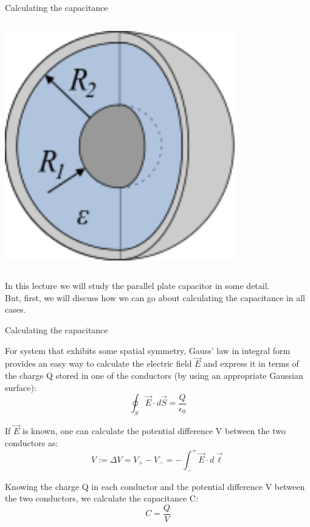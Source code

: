 \begin{frame}{Calculating the capacitance}
\begin{columns}
\begin{column}{0.33\textwidth}
\begin{center}
     \includegraphics[width=0.75\textwidth]{./images/schematics/capacitors_spherical_1.png}\\
   \end{center}
  \end{column}
\end{columns}

\vspace{0.2cm}
In this lecture we will study the parallel plate capacitor in some detail.\\

\vspace{0.2cm}
But, first, we will discuss how we can go about calculating the capacitance in all cases.\\

\end{frame}

%
%
%

\begin{frame}{Calculating the capacitance}

For system that exhibits some spatial symmetry,
Gauss' law in integral form provides an easy way to calculate the electric field $\vec{E}$
and express it in terms of the charge Q stored in one of the conductors
(by using an appropriate Gaussian surface):
\begin{equation*}
  \oint_{S} \vec{E} \cdot d\vec{S} = \frac{Q}{\epsilon_0}
\end{equation*}

If $\vec{E}$ is known, one can calculate the potential difference V between the two conductors as:
\begin{equation*}
  V := {\Delta}V = V_{+} - V_{-} = - \int_{-}^{+} \vec{E} \cdot d\vec{\ell}
\end{equation*}

Knowing the charge Q in each conductor and
the potential difference V between the two conductors,
we calculate the capacitance C:
\begin{equation*}
  C = \frac{Q}{V}
\end{equation*}

\end{frame}


